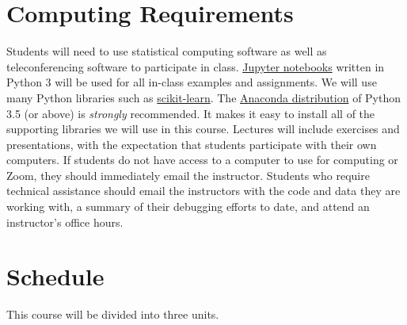 \documentclass[10pt]{memoir}
\begin{document}


\section{\textbf{Computing Requirements}}
Students will need to use statistical computing software as well as teleconferencing software to participate in class. \href{http://jupyter.org/}{Jupyter notebooks} written in Python 3 will be used for all in-class examples and assignments. We will use many Python libraries such as \href{https://scikit-learn.org/}{scikit-learn}. The \href{https://www.continuum.io/why-anaconda}{Anaconda distribution} of Python 3.5 (or above) is \textit{strongly} recommended. It makes it easy to install all of the supporting libraries we will use in this course. Lectures will include exercises and presentations, with the expectation that students participate with their own computers. If students do not have access to a computer to use for computing or Zoom, they should immediately email the instructor. Students who require technical assistance should email the instructors with the code and data they are working with, a summary of their debugging efforts to date, and attend an instructor's office hours.

\clearpage

\section{\textbf{Schedule}}

This course will be divided into three units. \\
\end{document}
